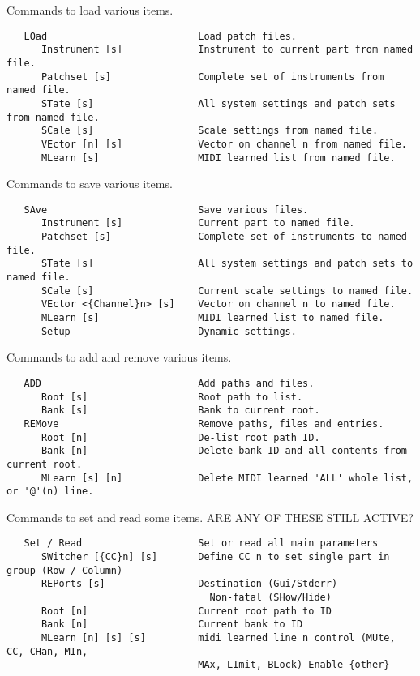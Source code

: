    Commands to load various items.

\begin{verbatim}
   LOad                          Load patch files.
      Instrument [s]             Instrument to current part from named file.
      Patchset [s]               Complete set of instruments from named file.
      STate [s]                  All system settings and patch sets from named file.
      SCale [s]                  Scale settings from named file.
      VEctor [n] [s]             Vector on channel n from named file.
      MLearn [s]                 MIDI learned list from named file.
\end{verbatim}

   Commands to save various items.

\begin{verbatim}
   SAve                          Save various files.
      Instrument [s]             Current part to named file.
      Patchset [s]               Complete set of instruments to named file.
      STate [s]                  All system settings and patch sets to named file.
      SCale [s]                  Current scale settings to named file.
      VEctor <{Channel}n> [s]    Vector on channel n to named file.
      MLearn [s]                 MIDI learned list to named file.
      Setup                      Dynamic settings.
\end{verbatim}

   Commands to add and remove various items.

\begin{verbatim}
   ADD                           Add paths and files.
      Root [s]                   Root path to list.
      Bank [s]                   Bank to current root.
   REMove                        Remove paths, files and entries.
      Root [n]                   De-list root path ID.
      Bank [n]                   Delete bank ID and all contents from current root.
      MLearn [s] [n]             Delete MIDI learned 'ALL' whole list, or '@'(n) line.
\end{verbatim}

   Commands to set and read some items.  ARE ANY OF THESE STILL ACTIVE?

\begin{verbatim}
   Set / Read                    Set or read all main parameters
      SWitcher [{CC}n] [s]       Define CC n to set single part in group (Row / Column)
      REPorts [s]                Destination (Gui/Stderr)
                                   Non-fatal (SHow/Hide)
      Root [n]                   Current root path to ID
      Bank [n]                   Current bank to ID
      MLearn [n] [s] [s]         midi learned line n control (MUte, CC, CHan, MIn,
                                 MAx, LImit, BLock) Enable {other}
\end{verbatim}

